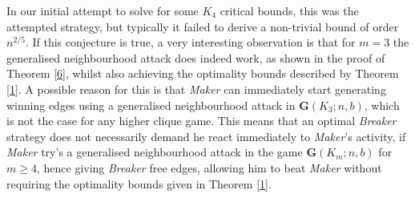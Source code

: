 \documentclass[a4paper,oneside,11pt]{report}
\begin{document}
In our initial attempt to solve for some $K_4$ critical bounds, this was the attempted strategy, but typically it failed to derive a non-trivial bound of order $n^{2/5}$. If this conjecture is true, a very interesting observation is that for $m = 3$ the generalised neighbourhood attack does indeed work, as shown in the proof of Theorem \ref{6}, whilst also achieving the optimality bounds described by Theorem \ref{1}. A possible reason for this is that \textit{Maker} can immediately start generating winning edges using a generalised neighbourhood attack in $\textbf{G}(K_3;n,b)$, which is not the case for any higher clique game. This means that an optimal \textit{Breaker} strategy does not necessarily demand he react immediately to \textit{Maker}'s activity, if \textit{Maker} try's a generalised neighbourhood attack in the game $\textbf{G}(K_m;n,b)$ for $m \geqslant 4$, hence giving \textit{Breaker} free edges, allowing him to beat \textit{Maker} without requiring the optimality bounds given in Theorem \ref{1}.




\end{document}
